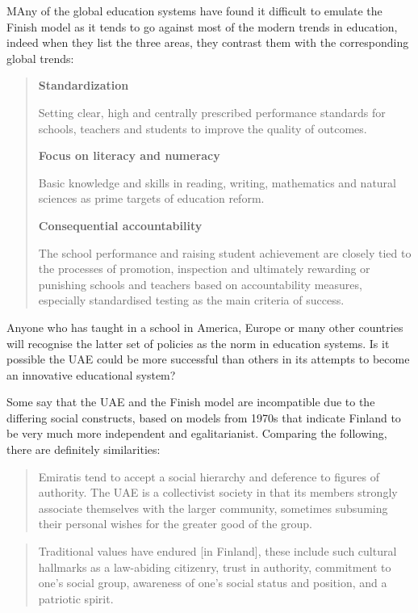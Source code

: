 MAny of the global education systems have found it difficult to emulate the Finish model as it tends to go against most of the modern trends in education, indeed when they list the three areas, they contrast them with the corresponding global trends:

\begin{quote}
\textbf{Standardization}

Setting clear, high and centrally prescribed performance standards for schools, teachers and students to improve the quality of outcomes.


\textbf{Focus on literacy and numeracy}

Basic knowledge and skills in reading, writing, mathematics and natural sciences as prime targets of education reform.


\textbf{Consequential accountability} 

The school performance and raising student achievement are closely tied to the processes of promotion, inspection and ultimately rewarding or punishing schools and teachers based on accountability measures, especially standardised testing as the main criteria of success.
\end{quote}

Anyone who has taught in a school in America, Europe or many other countries will recognise the latter set of policies as the norm in education systems. Is it possible the UAE could be more successful than others in its attempts to become an innovative educational system?

Some \cite{Hatherley-Greene2016} say that the UAE and the Finish model are incompatible due to the differing social constructs, based on models from 1970s that indicate Finland to be very much more independent and egalitarianist. Comparing the following, there are definitely similarities:

\begin{quote}
Emiratis tend to accept a social hierarchy and deference to figures of authority. The UAE is a collectivist society in that its members strongly associate themselves with the larger community, sometimes subsuming their personal wishes for the greater good of the group.
\end{quote} \cite{Hatherley-Greene2016}

\begin{quote}
Traditional values have endured [in Finland], these include such cultural hallmarks as a law-abiding citizenry, trust in authority, commitment to one’s social group, awareness of one’s social status and position, and a patriotic spirit.
\end{quote} \cite{Sahlberg2007}

